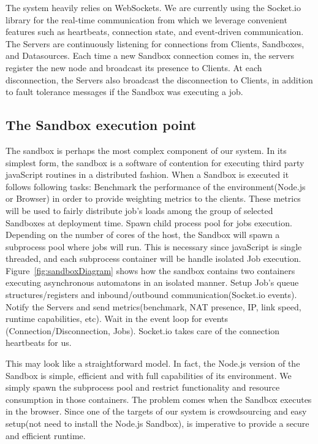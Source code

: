 \documentclass[10pt,reprint]{socc14}
\begin{document}
The system heavily relies on WebSockets. We are currently using the Socket.io \cite{Socket.} library for the real-time communication from which we leverage convenient features such as heartbeats, connection state, and event-driven communication. The Servers are continuously listening for connections from Clients, Sandboxes, and Datasources. Each time a new Sandbox connection comes in, the servers register the new node and broadcast its presence to Clients. At each disconnection, the Servers also broadcast the disconnection to Clients, in addition to fault tolerance messages if the Sandbox was executing a job.

\subsection{The Sandbox execution point}

The sandbox is perhaps the most complex component of our system. In its simplest form, the sandbox is a software of contention for executing third party javaScript routines in a distributed fashion. When a Sandbox is executed it follows following tasks:
Benchmark the performance of the environment(Node.js or Browser) in order to provide weighting metrics to the clients. These metrics will be used to fairly distribute job's loads among the group of selected Sandboxes at deployment time.
Spawn child process pool for jobs execution. Depending on the number of cores of the host, the Sandbox will spawn a subprocess pool where jobs will run. This is necessary since javaScript is single threaded, and each subprocess container will be handle isolated Job execution. Figure~\ref{fig:sandboxDiagram} shows how the sandbox contains two containers executing asynchronous automatons in an isolated manner.
Setup Job's queue structures/registers and inbound/outbound communication(Socket.io events).
Notify the Servers and send metrics(benchmark, NAT presence, IP, link speed, runtime capabilities, etc).
Wait in the event loop for events (Connection/Disconnection, Jobs). Socket.io takes care of the connection heartbeats for us.

This may look like a straightforward model. In fact, the Node.js version of the Sandbox is simple, efficient and with full capabilities of its environment. We simply spawn the subprocess pool and restrict functionality and resource consumption in those containers. The problem comes when the Sandbox executes in the browser. Since one of the targets of our system is crowdsourcing and easy setup(not need to install the Node.js Sandbox), is imperative to provide a secure and efficient runtime.
\end{document}
